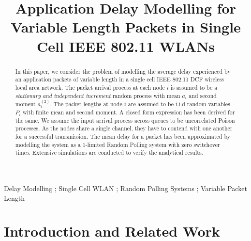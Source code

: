 \documentclass[10pt, conference, compsocconf]{IEEEtran}
\begin{document}
\title{Application Delay Modelling for Variable Length Packets in Single Cell IEEE 802.11 WLANs}


\author{
}



\maketitle


\begin{abstract}
In this paper, we consider the problem of modelling the average delay experienced by an application packets of variable length in a single cell IEEE 802.11 DCF wireless local area network. The packet arrival process at each node $i$ is assumed to be a \emph{stationary and independent increment} random process with mean $a_i$ and second moment $a^{(2)}_i$. The packet lengths at node $i$ are assumed to be i.i.d random variables $P_i$ with finite mean and second moment. A closed form expression has been derived for the same. We assume the input arrival process across queues to be uncorrelated Poison processes. As the nodes share a single channel, they have to contend with one another for a successful transmission. The mean delay for a packet has been approximated by modelling the system as a 1-limited Random Polling system with zero switchover times. Extensive simulations are conducted to verify the analytical results.	
\end{abstract}

\begin{IEEEkeywords}
Delay Modelling ; Single Cell WLAN ; Random Polling Systems ; Variable Packet Length
\end{IEEEkeywords}

\IEEEpeerreviewmaketitle

\section{\large{Introduction and Related Work}}
\label{intro}
\end{document}
